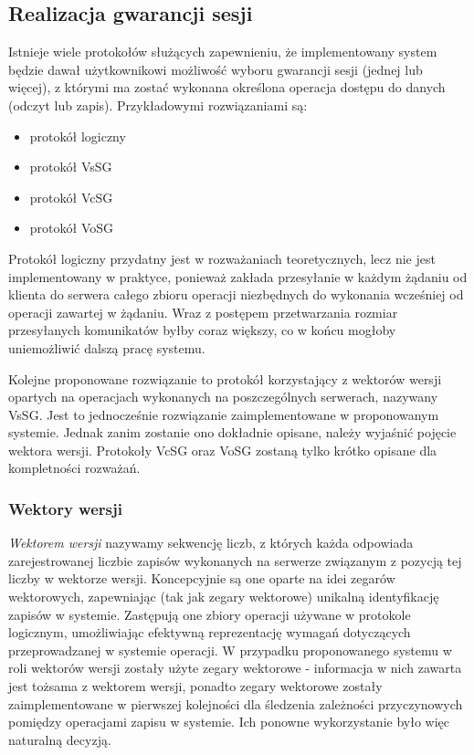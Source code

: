 \subsection{Realizacja gwarancji sesji}

Istnieje wiele protokołów służących zapewnieniu, że implementowany system będzie dawał użytkownikowi możliwość wyboru gwarancji sesji (jednej lub więcej), z którymi ma zostać wykonana określona operacja dostępu do danych (odczyt lub zapis). Przykładowymi rozwiązaniami są:
\begin{itemize}
    \item protokół logiczny
    \item protokół VsSG
    \item protokół VcSG
    \item protokół VoSG
\end{itemize}

Protokół logiczny przydatny jest w rozważaniach teoretycznych, lecz nie jest implementowany w praktyce, ponieważ zakłada przesyłanie w każdym żądaniu od klienta do serwera całego zbioru operacji niezbędnych do wykonania wcześniej od operacji zawartej w żądaniu. Wraz z postępem przetwarzania rozmiar przesyłanych komunikatów byłby coraz większy, co w końcu mogłoby uniemożliwić dalszą pracę systemu.

Kolejne proponowane rozwiązanie to protokół korzystający z wektorów wersji opartych na operacjach wykonanych na poszczególnych serwerach, nazywany VsSG. Jest to jednocześnie rozwiązanie zaimplementowane w proponowanym systemie. Jednak zanim zostanie ono dokładnie opisane, należy wyjaśnić pojęcie wektora wersji. Protokoły VcSG oraz VoSG zostaną tylko krótko opisane dla kompletności rozważań.

\subsubsection{Wektory wersji} \label{subsection:version_vector}


\textit{Wektorem wersji} nazywamy sekwencję liczb, z których każda odpowiada zarejestrowanej liczbie zapisów wykonanych na serwerze związanym z pozycją tej liczby w wektorze wersji. Koncepcyjnie są one oparte na idei zegarów wektorowych, zapewniając (tak jak zegary wektorowe) unikalną identyfikację zapisów w systemie. Zastępują one zbiory operacji używane w protokole logicznym, umożliwiając efektywną reprezentację wymagań dotyczących przeprowadzanej w systemie operacji. W przypadku proponowanego systemu w roli wektorów wersji zostały użyte zegary wektorowe - informacja w nich zawarta jest tożsama z wektorem wersji, ponadto zegary wektorowe zostały zaimplementowane w pierwszej kolejności dla śledzenia zależności przyczynowych pomiędzy operacjami zapisu w systemie. Ich ponowne wykorzystanie było więc naturalną decyzją.

